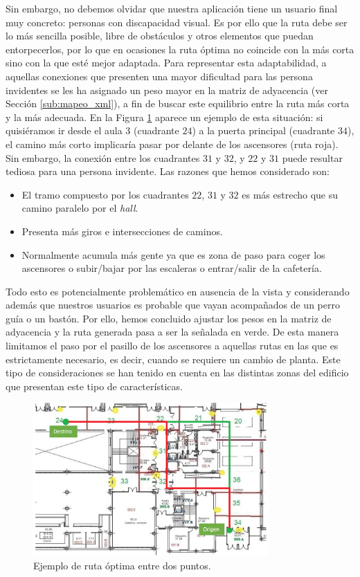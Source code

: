 Sin embargo, no debemos olvidar que nuestra aplicación tiene un usuario final muy concreto: personas con discapacidad visual. Es por ello que la ruta debe ser lo más sencilla posible, libre de obstáculos y otros elementos que puedan entorpecerlos, por lo que en ocasiones la ruta óptima no coincide con la más corta sino con la que esté mejor adaptada. Para representar esta adaptabilidad, a aquellas conexiones que presenten una mayor dificultad para las persona invidentes se les ha asignado un peso mayor en la matriz de adyacencia (ver Sección \ref{sub:mapeo_xml}), a fin de buscar este equilibrio entre la ruta más corta y la más adecuada. En la Figura \ref{fig:ruta_optima} aparece un ejemplo de esta situación: si quisiéramos ir desde el aula 3 (cuadrante $24$) a la puerta principal (cuadrante $34$), el camino más corto implicaría pasar por delante de los ascensores (ruta roja). Sin embargo, la conexión entre los cuadrantes $31$ y $32$, y $22$ y $31$ puede resultar tediosa para una persona invidente. Las razones que hemos considerado son: 
\begin{itemize}
	\item El tramo compuesto por los cuadrantes $22$, $31$ y $32$ es más estrecho que su camino paralelo por el \textit{hall}.
	\item Presenta más giros e intersecciones de caminos.
	\item Normalmente acumula más gente ya que es zona de paso para coger los ascensores o subir/bajar por las escaleras o entrar/salir de la cafetería.
\end{itemize} 
 	Todo esto es potencialmente problemático en ausencia de la vista y considerando además que nuestros usuarios es probable que vayan acompañados de un perro guía o un bastón. Por ello, hemos concluido ajustar los pesos en la matriz de adyacencia y la ruta generada pasa a ser la señalada en verde. De esta manera limitamos el paso por el pasillo de los ascensores a aquellas rutas en las que es estrictamente necesario, es decir, cuando se requiere un cambio de planta. Este tipo de consideraciones se han tenido en cuenta en las distintas zonas del edificio que presentan este tipo de características.


\begin{figure}[t]
	\centering
	\includegraphics[width=0.8\textwidth]{Imagenes/Capitulo4/mapa_ruta_optima}
	\caption{Ejemplo de ruta óptima entre dos puntos.}
	\label{fig:ruta_optima}
\end{figure}

